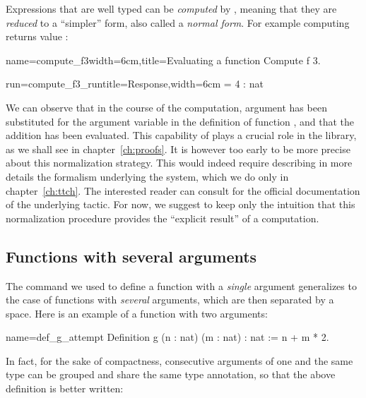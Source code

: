 Expressions that are well typed can be \emph{computed} by \Coq{},
meaning that they are \emph{reduced} to a ``simpler'' form, also
called a \emph{normal form}. For example computing  returns
value :

\begin{coq-left}{name=compute_f3}{width=6cm,title=Evaluating a function}
Compute f 3.
\end{coq-left}
\begin{coqout-right}{run=compute_f3_run}{title=Response,width=6cm}
 = 4 : nat
\end{coqout-right}

We can observe that in the course of the computation, argument  has been
substituted for the argument variable in the definition of function
, and that the addition has been evaluated.
This capability of \Coq{} plays a crucial role
in the \mcbMC{} library, as we shall see in chapter~\ref{ch:proofs}. It
is however too early to be
more precise about this normalization strategy. This would indeed
require describing in more details the formalism underlying the
\Coq{} system, which we do only in chapter~\ref{ch:ttch}. The
interested reader can consult \cite[section
5.3.7, ``Performing computations'']{Coq:manual} for
the official documentation of the underlying 
tactic.
For now, we suggest to keep only the intuition that this
normalization procedure provides the ``explicit result'' of a
computation.


\subsection{Functions with several arguments}
\label{sec:fun-sev-args}
The command we used to define a function with a \emph{single} argument
generalizes to the case of functions with \emph{several} arguments, which are
then separated by a space. Here is an example of a function with two
arguments:

\begin{coq}{name=def_g_attempt}{}
Definition g (n : nat) (m : nat) : nat := n + m * 2.
\end{coq}
In fact, for the sake of compactness, consecutive arguments of one and
the same
type can be grouped and share the same type annotation, so that the
above definition is better written:

